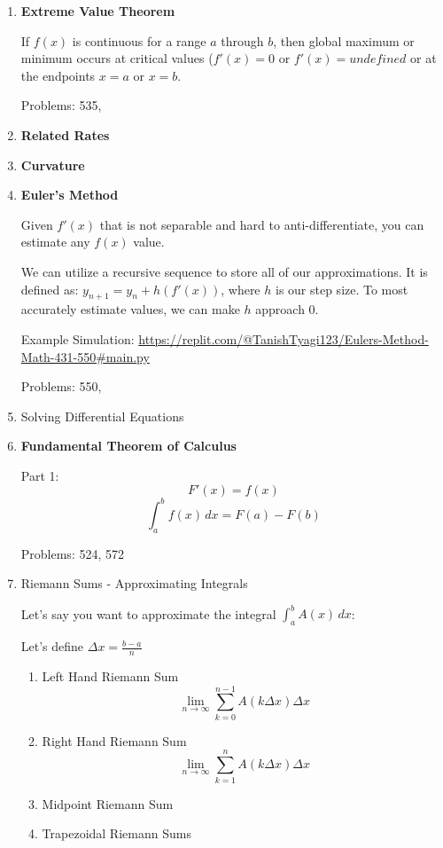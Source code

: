 \documentclass{article}
\begin{document}
\begin{enumerate}
\item \textbf{Extreme Value Theorem}

If $f(x)$ is continuous for a range $a$ through $b$, then global maximum or minimum occurs at critical values ($f'(x) = 0$ or $f'(x) = undefined$ or at the endpoints $x = a$ or $x = b$.

Problems: 535, 

\item \textbf{Related Rates}

\item \textbf{Curvature} 

\item \textbf{Euler's Method}

Given $f'(x)$ that is not separable and hard to anti-differentiate, you can estimate any $f(x)$ value. 

We can utilize a recursive sequence to store all of our approximations. It is defined as: $y_{n+1} = y_{n} + h(f'(x))$, where $h$ is our step size. To most accurately estimate values, we can make $h$ approach 0.

Example Simulation: \url{https://replit.com/@TanishTyagi123/Eulers-Method-Math-431-550#main.py}

Problems: 550, 

\item Solving Differential Equations 

\item \textbf{Fundamental Theorem of Calculus} 

Part 1: 
$$ F'(x) = f(x) $$
$$ \int_{a}^{b} f(x) \,dx = F(a) - F(b) $$

Problems: 524, 572

\item Riemann Sums - Approximating Integrals

Let's say you want to approximate the integral $\int_{a}^{b} A(x) \,dx$: 

Let's define $\Delta x = \frac{b - a}{n}$

    \begin{enumerate}
    \item Left Hand Riemann Sum
$$
\lim_{n\to\infty} \sum_{k=0} ^{n-1} A(k\Delta x)\Delta x 
$$
    \item Right Hand Riemann Sum 
$$
\lim_{n\to\infty} \sum_{k=1} ^{n} A(k\Delta x)\Delta x 
$$

    \item Midpoint Riemann Sum 
    \item Trapezoidal Riemann Sums
  \end{enumerate}
  


\end{enumerate}
\end{document}
